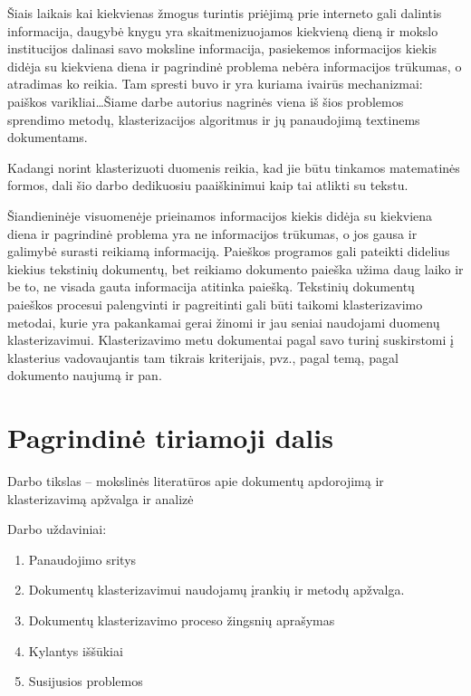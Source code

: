 \documentclass{VUMIFInfKursinis}
\begin{document}
	Šiais laikais kai kiekvienas žmogus turintis priėjimą prie interneto gali dalintis informacija, daugybė knygu yra skaitmenizuojamos kiekvieną dieną ir mokslo institucijos dalinasi savo moksline informacija, pasiekemos informacijos kiekis didėja su kiekviena diena ir pagrindinė problema nebėra informacijos trūkumas, o atradimas ko reikia. Tam spresti buvo ir yra kuriama ivairūs mechanizmai: paiškos varikliai\ldots Šiame darbe autorius nagrinės viena iš šios problemos sprendimo metodų, klasterizacijos algoritmus ir jų panaudojimą textinems dokumentams. %

Kadangi norint klasterizuoti duomenis reikia, kad jie būtu tinkamos matematinės formos, dali šio darbo dedikuosiu paaiškinimui kaip tai atlikti su tekstu.

	Šiandieninėje visuomenėje prieinamos informacijos kiekis didėja su kiekviena diena ir pagrindinė problema yra ne informacijos trūkumas, o jos gausa ir galimybė surasti reikiamą informaciją. Paieškos programos gali pateikti didelius kiekius tekstinių dokumentų, bet reikiamo dokumento paieška užima daug laiko ir be to, ne visada gauta informacija atitinka paiešką. Tekstinių dokumentų paieškos procesui palengvinti ir pagreitinti gali būti taikomi klasterizavimo metodai, kurie yra pakankamai gerai žinomi ir jau seniai naudojami duomenų klasterizavimui.  Klasterizavimo metu  dokumentai pagal savo turinį suskirstomi į klasterius vadovaujantis tam tikrais kriterijais, pvz., pagal temą, pagal dokumento naujumą ir pan. 

\section{Pagrindinė tiriamoji dalis}
	Darbo tikslas – mokslinės literatūros apie dokumentų apdorojimą ir klasterizavimą apžvalga ir analizė  

	Darbo uždaviniai: 
	\begin{enumerate}
		\item Panaudojimo sritys
		\item Dokumentų klasterizavimui naudojamų įrankių ir metodų apžvalga.
		\item Dokumentų klasterizavimo proceso žingsnių aprašymas
		\item Kylantys iššūkiai  
		\item Susijusios problemos 
	\end{enumerate}
\end{document}
